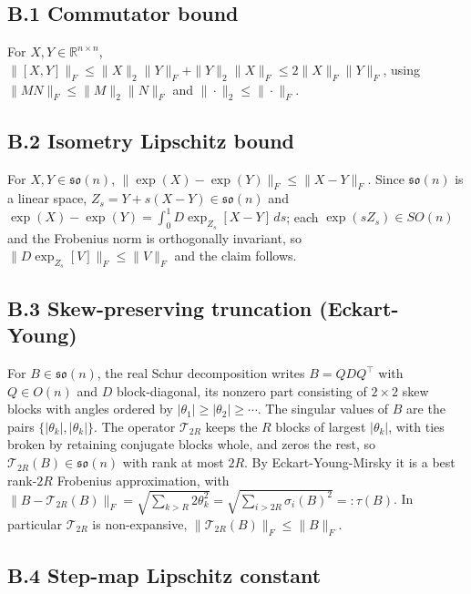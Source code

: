 \documentclass[
]{article}
\begin{document}
\subsection{B.1 Commutator bound}\label{b.1-commutator-bound}

For \(X,Y\in\mathbb{R}^{n\times n}\), \(\|[X,Y]\|_F\leq\|X\|_2\|Y\|_F+\|Y\|_2\|X\|_F\leq 2\|X\|_F\|Y\|_F\), using \(\|MN\|_F\leq\|M\|_2\|N\|_F\) and \(\|\cdot\|_2\leq\|\cdot\|_F\).

\subsection{B.2 Isometry Lipschitz bound}\label{b.2-isometry-lipschitz-bound}

For \(X,Y\in\mathfrak{so}(n)\), \(\|\exp(X)-\exp(Y)\|_F\leq\|X-Y\|_F\). Since \(\mathfrak{so}(n)\) is a linear space, \(Z_s=Y+s(X-Y)\in\mathfrak{so}(n)\) and \(\exp(X)-\exp(Y)=\int_0^1 D\exp_{Z_s}[X-Y]\,ds\); each \(\exp(sZ_s)\in SO(n)\) and the Frobenius norm is orthogonally invariant, so \(\|D\exp_{Z_s}[V]\|_F\leq\|V\|_F\) and the claim follows.

\subsection{B.3 Skew-preserving truncation (Eckart-Young)}\label{b.3-skew-preserving-truncation-eckart-young}

For \(B\in\mathfrak{so}(n)\), the real Schur decomposition writes \(B=QDQ^\top\) with \(Q\in O(n)\) and \(D\) block-diagonal, its nonzero part consisting of \(2\times 2\) skew blocks with angles ordered by \(|\theta_1|\geq|\theta_2|\geq\cdots\). The singular values of \(B\) are the pairs \(\{|\theta_k|,|\theta_k|\}\). The operator \(\mathcal{T}_{2R}\) keeps the \(R\) blocks of largest \(|\theta_k|\), with ties broken by retaining conjugate blocks whole, and zeros the rest, so \(\mathcal{T}_{2R}(B)\in\mathfrak{so}(n)\) with rank at most \(2R\). By Eckart-Young-Mirsky it is a best rank-\(2R\) Frobenius approximation, with \(\|B-\mathcal{T}_{2R}(B)\|_F=\sqrt{\sum_{k>R}2\theta_k^2}=\sqrt{\sum_{i>2R}\sigma_i(B)^2}=:\tau(B)\). In particular \(\mathcal{T}_{2R}\) is non-expansive, \(\|\mathcal{T}_{2R}(B)\|_F\leq\|B\|_F\).

\subsection{B.4 Step-map Lipschitz constant}\label{b.4-step-map-lipschitz-constant}
\end{document}
